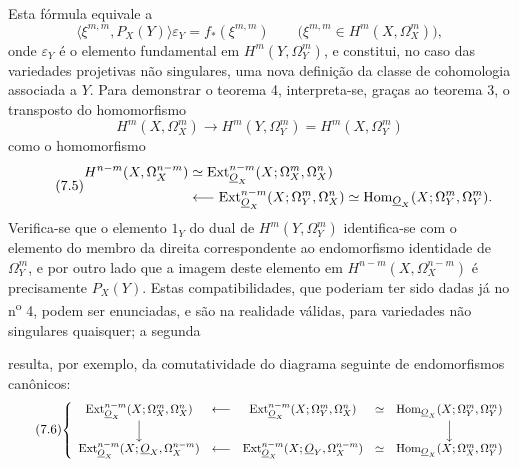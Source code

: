 Esta fórmula equivale a
\begin{equation}\tag{7.4 bis}
  \bigl\langle\xi^{m,m},P_X(Y)\bigr\rangle\varepsilon_Y
  =f_{*}(\xi^{m,m})
  \qquad
  \bigl(\xi^{m,m}\in H^{m}(X,\Omega_X^{m})\bigr),
\end{equation}
 onde
$\varepsilon_Y$ é o elemento fundamental em $H^{m}(Y,\Omega_Y^{m})$, e
constitui, no caso das variedades projetivas não singulares, uma nova
definição da classe de cohomologia associada a $Y$. Para demonstrar o
teorema 4, interpreta-se, graças ao teorema 3, o transposto do homomorfismo
\[
  H^{m}(X,\Omega_X^{m})
  \longrightarrow H^{m}(Y,\Omega_Y^{m})
  =H^{m}(X,\Omega_Y^{m})
\]
como o homomorfismo
\begin{equation}\tag{7.5}
\begin{split}
  H^{n-m}(X,\Omega_X^{n-m})
  &\simeq
  \operatorname{Ext}_{\underline{O}_X}^{n-m}(X;\Omega_X^{m},\Omega_X^{n})\\
  &\longleftarrow
  \operatorname{Ext}_{\underline{O}_X}^{n-m}(X;\Omega_Y^{m},\Omega_X^{n})
  \simeq
  \operatorname{Hom}_{\underline{O}_X}(X;\Omega_Y^{m},\Omega_Y^{m}).
\end{split}
\end{equation}
Verifica-se que o elemento $1_Y$ do dual de $H^{m}(Y,\Omega_Y^{m})$ identifica-se
com o elemento do membro da direita correspondente ao endomorfismo identidade de
$\Omega_Y^{m}$, e por outro lado que a imagem deste elemento em
$H^{n-m}(X,\Omega_X^{n-m})$ é precisamente $P_X(Y)$. Estas compatibilidades, que poderiam
ter sido dadas já no n\textsuperscript{o} 4, podem ser enunciadas, e são
na realidade válidas, para variedades não singulares quaisquer; a segunda

resulta, por exemplo, da comutatividade do diagrama seguinte de endomorfismos
canônicos:
\begin{equation}\tag{7.6}
\resizebox{\textwidth}{!}{$
\left\{
\begin{array}{ccccc}
\operatorname{Ext}_{\Osh_X}^{n-m}(X;\Omega_X^{m},\Omega_X^{n})
&\longleftarrow&
\operatorname{Ext}_{\Osh_X}^{n-m}(X;\Omega_Y^{m},\Omega_X^{n})
&\simeq&
\operatorname{Hom}_{\Osh_X}(X;\Omega_Y^{m},\Omega_Y^{m})\\[3pt]
\Big\downarrow&&&&\Big\downarrow\\[3pt]
\operatorname{Ext}_{\Osh_X}^{n-m}(X;\Osh_X,\Omega_X^{n-m})
&\longleftarrow&
\operatorname{Ext}_{\Osh_X}^{n-m}(X;\Osh_Y,\Omega_X^{n-m})
&\simeq&
\operatorname{Hom}_{\Osh_X}(X;\Omega_X^{m},\Omega_Y^{m})
\end{array}
\right.
$}
\end{equation}

